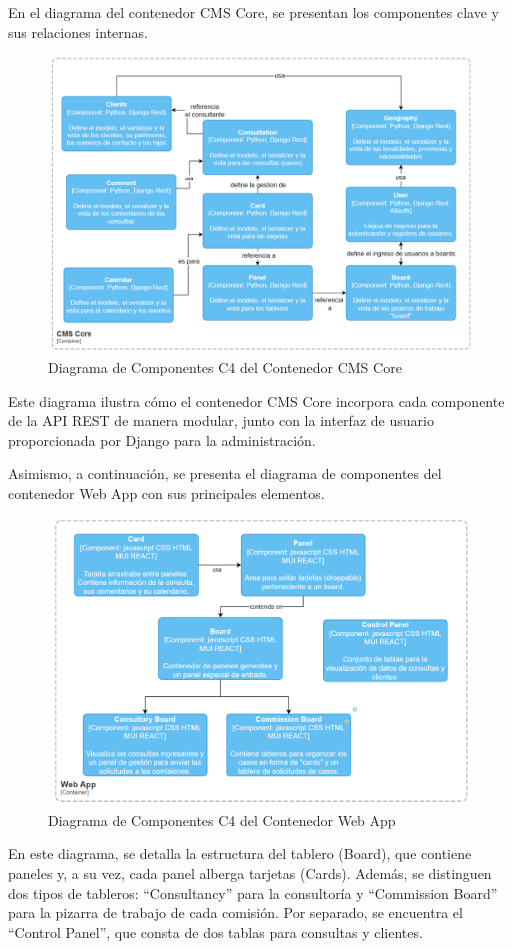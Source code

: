 En el diagrama del contenedor CMS Core, se presentan los componentes clave y sus relaciones internas.
\begin{figure}[H]
\centering
\includegraphics[width=1\linewidth]{fig/container-cms-core.png}
\caption{Diagrama de Componentes C4 del Contenedor CMS Core}
\label{fig:c4-03-cmscore}
\end{figure}
Este diagrama ilustra cómo el contenedor CMS Core incorpora cada componente de la API REST de manera modular, junto con la interfaz de usuario proporcionada por Django para la administración.

Asimismo, a continuación, se presenta el diagrama de componentes del contenedor Web App con sus principales elementos.
\begin{figure}[H]
\centering
\includegraphics[width=1\linewidth]{fig/container-web-app.png}
\caption{Diagrama de Componentes C4 del Contenedor Web App}
\label{fig:c4-03-webapp}
\end{figure}
En este diagrama, se detalla la estructura del tablero (Board), que contiene paneles y, a su vez, cada panel alberga tarjetas (Cards). Además, se distinguen dos tipos de tableros: ``Consultancy'' para la consultoría y ``Commission Board'' para la pizarra de trabajo de cada comisión. Por separado, se encuentra el ``Control Panel'', que consta de dos tablas para consultas y clientes.


